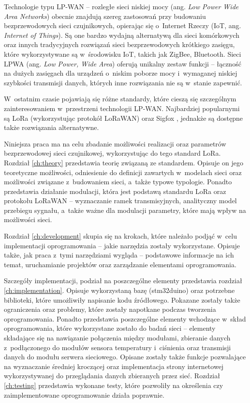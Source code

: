Technologie typu LP-WAN -- rozległe sieci niskiej mocy (ang. \textsl{Low Power Wide Area Networks}) obecnie znajdują
szereg zastosowań przy budowaniu bezprzewodowych sieci czujnikowych, opierając się o~Internet Rzeczy (IoT, ang.
\textsl{Internet of Things}). Są one bardzo wydajną alternatywą dla sieci komórkowych oraz innych tradycyjnych rozwiązań
sieci bezprzewodowych krótkiego zasięgu, które wykorzystywane są w~środowisku IoT, takich jak ZigBee, Bluetooth. Sieci
LPWA (ang. \textsl{Low Power, Wide Area}) oferują unikalny zestaw funkcji -- łączność na dużych zasięgach dla urządzeń
o~niskim poborze mocy i~wymaganej niskiej szybkości transmisji danych, których inne rozwiązania nie są w~stanie
zapewnić.

W~ostatnim czasie pojawiają się różne standardy, które cieszą się szczególnym zainteresowaniem w~przestrzeni technologii
LP-WAN. Najbardziej popularnymi są LoRa (wykorzystując protokół LoRaWAN)\cite{lora-alliance} oraz Sigfox \cite{sigfox},
jednakże są dostępne także rozwiązania alternatywne.

Niniejsza praca ma na celu zbadanie możliwości realizacji oraz parametrów  bezprzewodowej sieci czujnikowej,
wykorzystując do tego standard LoRa. Rozdział \ref{ch:theory} przedstawia teorię związaną ze standardem. Opisuje on jego
teoretyczne możliwości, odniesienie do definicji zawartych w~modelach sieci oraz możliwości związane z~budowaniem sieci,
a~także typowe typologie. Ponadto przedstawia działanie modulacji, która jest podstawą standardu LoRa oraz protokołu
LoRaWAN -- wyznaczanie ramek transmisyjnych, analityczny model przebiegu sygnału, a~także ważne dla modulacji parametry,
które mają wpływ na możliwości sieci.

Rozdział \ref{ch:development} skupia się na krokach, które należało podjąć w~celu implementacji oprogramowania --
jakie narzędzia zostały wykorzystane. Opisuje także, jak praca z~tymi narzędziami wygląda -- podstawowe informacje na
ich temat, uruchamianie projektów oraz zarządzanie elementami oprogramowania.

Szczegóły implementacji, podział na poszczególne elementy przedstawia rozdział \ref{ch:implementation}. Opisuje
wykorzystaną bazę (stm32duino) oraz potrzebne biblioteki, które umożliwiły napisanie kodu źródłowego. Pokazane zostały
także ograniczenia oraz problemy, które zostały napotkane podczas tworzenia oprogramowania. Ponadto przedstawia
poszczególne elementy wchodzące w~skład oprogramowania, które wykorzystane zostało do badań sieci -- elementy składające
się na nawiązanie połączenia między modułami, zbieranie danych z~podłączonego do modułów sensora temperatury i~ciśnienia
oraz transmisji danych do modułu serwera sieciowego. Opisane zostały także funkcje pozwalające na wyznaczanie średniej
kroczącej oraz implementacja strony internetowej wykorzystywanej do przeglądania danych zbieranych przez sieć. Rozdział
\ref{ch:testing} przedstawia wykonane testy, które pozwoliły na określenia czy zaimplementowane oprogramowanie działa
poprawnie.

